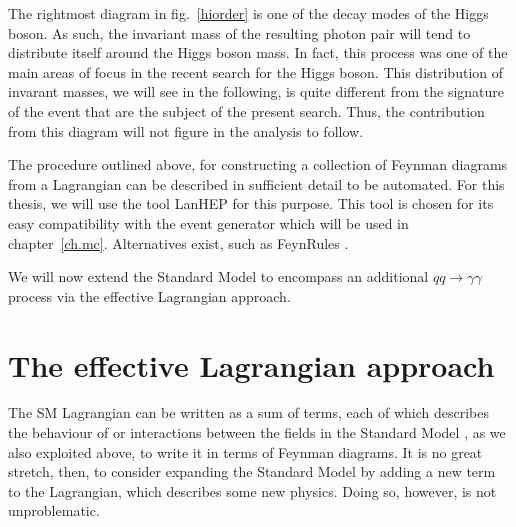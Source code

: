 The rightmost diagram in fig.~\ref{hiorder} is one of the decay modes of the Higgs boson. As such, the invariant mass of the resulting photon pair will tend to distribute itself around the Higgs boson mass. In fact, this process was one of the main areas of focus in the recent search for the Higgs boson. This distribution of invarant masses, we will see in the following, is quite different from the signature of the event that are the subject of the present search. Thus, the contribution from this diagram will not figure in the analysis to follow.

The procedure outlined above, for constructing a collection of Feynman diagrams from a Lagrangian can be described in sufficient detail to be automated. For this thesis, we will use the tool LanHEP \cite{lanhep} for this purpose. This tool is chosen for its easy compatibility with the event generator which will be used in chapter~\ref{ch.mc}. Alternatives exist, such as FeynRules \cite{feynrules}.

We will now extend the Standard Model to encompass an additional $qq\rightarrow\gamma\gamma$ process via the effective Lagrangian approach.

\section{The effective Lagrangian approach}

The SM Lagrangian can be written as a sum of terms, each of which describes the behaviour of or interactions between the fields in the Standard Model \cite{srednicki}, as we also exploited above, to write it in terms of Feynman diagrams. It is no great stretch, then, to consider expanding the Standard Model by adding a new term to the Lagrangian, which describes some new physics. Doing so, however, is not unproblematic.

